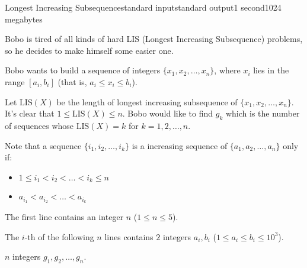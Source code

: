 \begin{problem}{Longest Increasing Subsequence}{standard input}{standard output}{1 second}{1024 megabytes}

Bobo is tired of all kinds of hard LIS (Longest Increasing Subsequence) problems,
so he decides to make himself some easier one.

Bobo wants to build a sequence of integers $\{x_1, x_2, \dots, x_n\}$,
where $x_i$ lies in the range $[a_i, b_i]$ (that is, $a_i \leq x_i \leq b_i$). 

Let $\mathrm{LIS}(X)$ be the length of longest increasing subsequence of $\{x_1, x_2, \dots, x_n\}$.
It's clear that $1 \leq \mathrm{LIS}(X) \leq n$. 
Bobo would like to find $g_k$ which is the number of sequences whose $\mathrm{LIS}(X) = k$ for $k = 1, 2, \dots, n$.

Note that a sequence $\{i_1, i_2, \dots, i_k\}$ is a increasing sequence of $\{a_1, a_2, \dots, a_n\}$ only if:
\begin{itemize}
\item $1 \leq i_1 < i_2 < \dots < i_k \leq n$
\item $a_{i_1} < a_{i_2} < \dots < a_{i_k}$
\end{itemize}


\InputFile
The first line contains an integer $n$ ($1 \leq n \leq 5$). 

The $i$-th of the following $n$ lines contains $2$ integers $a_i, b_i$ ($1 \leq a_i \leq b_i \leq 10^3$). 

\OutputFile
$n$ integers $g_1, g_2, \dots, g_n$.

\Examples

\begin{example}
%
%
\end{example}

\end{problem}

